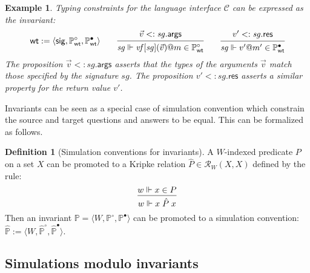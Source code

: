 \documentclass[11pt,oneside]{book}
\newtheorem{example}[theorem]{Example}
\theoremstyle{definition}
\newtheorem{definition}[theorem]{Definition}
\newcommand{\kw}[1]{\ensuremath{ \mathsf{#1} }}
\newcommand{\que}{\circ}         %
\newcommand{\ans}{\bullet}       %
\begin{document}
\begin{example} \label{ex:wt} %
Typing constraints for the language interface $\mathcal{C}$
can be expressed as the invariant:
\[
  \kw{wt} :=
    \langle
      \kw{sig},
      \mathbb{P}_\kw{wt}^\que,
      \mathbb{P}_\kw{wt}^\ans
    \rangle
  \qquad
  \begin{prooftree}
    \hypo{\vec{v} <: \mathit{sg}.\kw{args}}
    \infer1{\mathit{sg} \Vdash
      \mathit{vf}[\mathit{sg}](\vec{v})@m \in \mathbb{P}_\kw{wt}^\que}
  \end{prooftree}
  \qquad
  \begin{prooftree}
    \hypo{v' <: \mathit{sg}.\kw{res}}
    \infer1{\mathit{sg} \Vdash
      v'@m' \in \mathbb{P}_\kw{wt}^\ans}
  \end{prooftree}
\]
The proposition $\vec{v} <: \mathit{sg}.\kw{args}$
asserts that the types of the arguments $\vec{v}$
match those specified by the signature $\mathit{sg}$.
The proposition $v' <: \mathit{sg}.\kw{res}$
asserts a similar property for the return value $v'$.
\end{example}

Invariants can be seen as a special case of simulation convention
which constrain the source and target questions and answers
to be equal.
This can be formalized as follows.

\begin{definition}[Simulation conventions for invariants]
A $W$-indexed predicate $P$ on a set $X$
can be promoted to a Kripke relation
$\hat{P} \in \mathcal{R}_W(X, X)$
defined by the rule:
\[
  \begin{prooftree}
    \hypo{w \Vdash x \in P}
    \infer1{w \Vdash x \mathrel{\hat{P}} x}
  \end{prooftree}
\]
Then an invariant
$\mathbb{P} = \langle W, \mathbb{P}^\que, \mathbb{P}^\ans \rangle$
can be promoted to a simulation convention:
$\hat{\mathbb{P}} :=
 \langle W, \hat{\mathbb{P}}^\que, \hat{\mathbb{P}}^\ans \rangle$.
\end{definition}


\subsection{Simulations modulo invariants} \label{sec:fsim-inv} %
\end{document}
